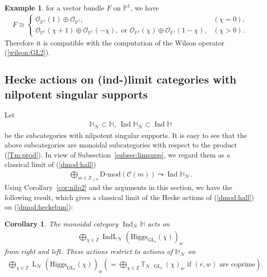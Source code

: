 \documentclass [11pt,oneside,a4paper,mathscr]{amsart}
\newtheorem{cor}[thm]{Corollary}
\theoremstyle{definition}
\newtheorem{example}[thm]{Example}
\renewcommand{\geq}{\geqslant}
\newcommand{\LL}{\operatorname{L}}
\newcommand{\Ind}{\operatorname{Ind}}
\newcommand{\IndL}{\operatorname{IndL}}
\newcommand{\GL}{\operatorname{GL}}
\newcommand{\Hig}{\mathrm{Higgs}}
\begin{document}
\begin{example}
    for a vector bundle $F$ on $\mathbb{P}^1$, we have 
    \begin{align*}
    F\cong \begin{cases}
        \mathcal{O}_{\mathbb{P}^1}(1)\oplus \mathcal{O}_{\mathbb{P}^1}, & (\chi=0), \\
         \mathcal{O}_{\mathbb{P}^1}(\chi+1)\oplus \mathcal{O}_{\mathbb{P}^1}(-\chi), \mbox{ or }
         \mathcal{O}_{\mathbb{P}^1}(\chi)\oplus \mathcal{O}_{\mathbb{P}^1}(1-\chi), & (\chi>0).
        \end{cases}
    \end{align*}
    Therefore it is compatible with the computation of the Wilson operator (\ref{wilson:GL2}). 
\end{example}

\subsection{Hecke actions on (ind-)limit categories with nilpotent singular supports}
Let 
\begin{align*}
    \mathbb{H}_{\mathcal{N}} \subset \mathbb{H}, \ \Ind \mathbb{H}_{\mathcal{N}} \subset \Ind \mathbb{H}
\end{align*}
be the subcategories with nilpotent singular supports. It is easy to see that the above subcategories 
are monoidal subcategories with respect to the product (\ref{Tm:prod}). 
In view of Subsection~\ref{subsec:limsupp}, we regard them as 
a classical limit of (\ref{dmod:hall})
\begin{align*}
    \bigoplus_{m\in \mathbb{Z}_{\geq 0}} \text{D-mod}(\mathcal{C}(m)) \leadsto \Ind\mathbb{H}_{\mathcal{N}}.
\end{align*}
Using Corollary~\ref{cor:nilp2} and the arguments in this section, 
we have the following result, which gives a classical limit of the 
Hecke actions of (\ref{dmod:hall}) on (\ref{dmod:heckebun}): 
\begin{cor}\label{cor:genuinehecke}
The monoidal category $\Ind_{\mathcal{N}}\mathbb{H}$ acts on 
\begin{align*}
    \bigoplus_{\chi \in \mathbb{Z}}\IndL_{\mathcal{N}}(\Hig_{\GL_r}(\chi))_w
\end{align*}
from right and left. These actions restrict to actions of $\mathbb{H}_{\mathcal{N}}$ on 
\begin{align*}
    \bigoplus_{\chi \in \mathbb{Z}}\LL_{\mathcal{N}}(\Hig_{\GL_r}(\chi))_w \left(=\bigoplus_{\chi\in \mathbb{Z}}\mathbb{T}_{\mathcal{N}, \GL_r}(\chi)_w \mbox{ if }(r,w) \mbox{ are coprime} \right).
\end{align*}
\end{cor}
\end{document}
